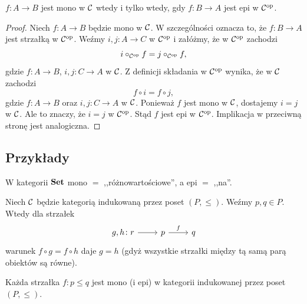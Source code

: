 \begin{stwierdzenie}
$f\colon A\to B$ jest mono w $\mathcal{C}$ wtedy i tylko wtedy, gdy $f\colon B\to A$ jest epi w $\mathcal{C}^{\mathrm{op}}$.
\end{stwierdzenie}

\begin{proof}
Niech $f\colon A\to B$ będzie mono w $\mathcal{C}$. W szczególności oznacza to, że $f\colon B\to A$ jest strzałką w $\mathcal{C}^{\mathrm{op}}$. Weźmy $i,j\colon A\to C$ w $\mathcal{C}^{\mathrm{op}}$ i załóżmy, że w $\mathcal{C}^{\mathrm{op}}$ zachodzi
\[
i\circ_{\mathcal{C}^{\mathrm{op}}} f = j\circ_{\mathcal{C}^{\mathrm{op}}} f,
\]
gdzie $f\colon A\to B$, $i,j\colon C\to A$ w $\mathcal{C}$. Z definicji składania w $\mathcal{C}^{\mathrm{op}}$ wynika, że w $\mathcal{C}$ zachodzi
\[
f\circ i = f\circ j,
\]
gdzie $f\colon A\to B$ oraz $i,j\colon C\to A$ w $\mathcal{C}$. Ponieważ $f$ jest mono w $\mathcal{C}$, dostajemy $i=j$ w $\mathcal{C}$. Ale to znaczy, że $i=j$ w $\mathcal{C}^{\mathrm{op}}$. Stąd $f$ jest epi w $\mathcal{C}^{\mathrm{op}}$. Implikacja w przeciwną stronę jest analogiczna.
\end{proof}

\subsection{Przykłady}

\begin{przyklad}
W kategorii $\mathbf{Set}$ mono $=$ ,,różnowartościowe'', a epi $=$ ,,na''.
\end{przyklad}

\begin{przyklad}
Niech $\mathcal{C}$ będzie kategorią indukowaną przez poset $(P,\leq)$. Weźmy $p,q\in P$. Wtedy dla strzałek
\[
\begin{tikzcd}
g,h\colon r \arrow[r] & p \arrow[r, "f"] & q
\end{tikzcd}
\]
warunek $f\circ g = f\circ h$ daje $g=h$ (gdyż wszystkie strzałki między tą samą parą obiektów są równe).
\end{przyklad}

\begin{wniosek}
Każda strzałka $f\colon p\leq q$ jest mono (i epi) w kategorii indukowanej przez poset $(P,\leq)$.
\end{wniosek}

